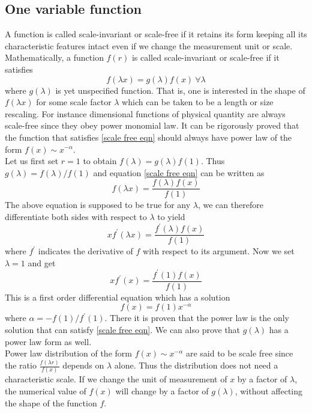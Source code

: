 	\subsection{One variable function}
	A function is called scale-invariant or scale-free if it retains its form keeping all its characteristic features intact even if we change the measurement unit or scale. Mathematically, a function $f(r)$ is called scale-invariant or scale-free if it satisfies
	\begin{equation}
		f(\lambda x) = g(\lambda) f(x) \ \forall \lambda
		\label{scale free eqn}
	\end{equation}
	where $g(\lambda)$ is yet unspecified function. That is, one is interested in the shape of $f(\lambda x)$ for some scale factor $\lambda$ which can be taken to be a length or size rescaling. For instance dimensional functions of physical quantity are always scale-free since they obey power monomial law. It can be rigorously proved that the function that satisfies \ref{scale free eqn} should always have power law of the form $f(x) \sim x^{-\alpha}$.\\
	Let us first set $r=1$ to obtain $f(\lambda) = g(\lambda)f(1)$. Thus $g(\lambda)=f(\lambda)/f(1)$ and equation \ref{scale free eqn} can be written as
	\begin{equation}
		f(\lambda x) = \frac{f(\lambda) f(x)}{f(1)}
	\end{equation}
	The above equation is supposed to be true for any $\lambda$, we can therefore differentiate both sides with respect to $\lambda$ to yield
	\begin{equation}
		x f^\prime(\lambda x) = \frac{f^\prime(\lambda) f(x)}{f(1)}
	\end{equation}
	where $f^\prime$ indicates the derivative of $f$ with respect to its argument. Now we set $\lambda=1$ and get
	\begin{equation}
		x f^\prime(x) = \frac{f^\prime(1) f(x)}{f(1)}
	\end{equation}
	This is a first order differential equation which has a solution
	\begin{equation}
		f(x) = f(1) x^{-\alpha}
	\end{equation}
	where $\alpha = - f(1) / f^\prime (1)$. There it is proven that the power law is the only solution that can satisfy \ref{scale free eqn}. We can also prove that $g(\lambda)$ has a power law form as well.\\
	Power law distribution of the form $f(x) \sim x^{-\alpha}$ are said to be scale free since the ratio $\frac{f(\lambda r)}{f(x)}$ depends on $\lambda$ alone. Thus the distribution does not need a characteristic scale. If we change the unit of measurement of $x$ by a factor of $\lambda$, the numerical value of $f(x)$ will change by a factor of $g(\lambda)$, without affecting the shape of the function $f$. 
	
